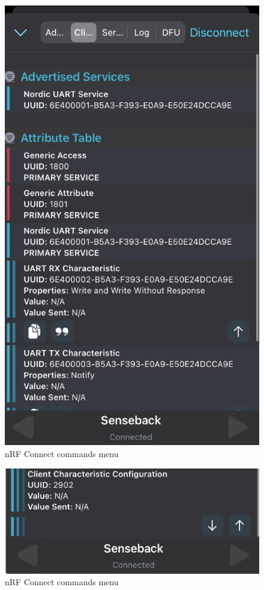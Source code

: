 \documentclass{Configuration_Files/PoliMi3i_thesis}
\begin{document}
\begin{figure}[H]
    \centering
    \includegraphics[scale=0.6]{Multicentral/11.png}
    \caption{nRF Connect commands menu}
    \label{multicentral_11}
\end{figure}

\begin{figure}[H]
    \centering
    \includegraphics[scale=0.6]{Multicentral/12.png}
    \caption{nRF Connect commands menu}
    \label{multicentral_12}
\end{figure}
\end{document}
